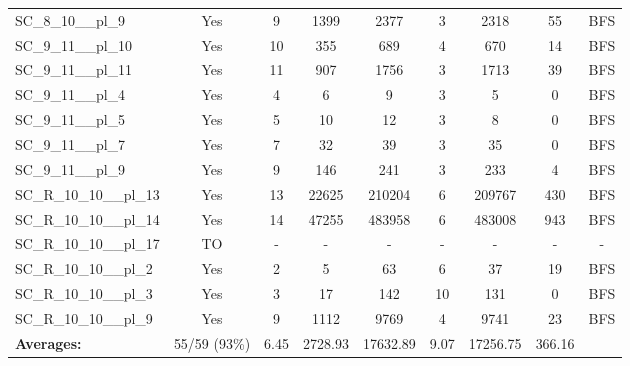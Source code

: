 \documentclass{article}
\begin{document}
\begin{tabular}{lcccccccc}
SC\_8\_10\_\_pl\_9 & Yes & 9 & 1399 & 2377 & 3 & 2318 & 55 & BFS \\
SC\_9\_11\_\_pl\_10 & Yes & 10 & 355 & 689 & 4 & 670 & 14 & BFS \\
SC\_9\_11\_\_pl\_11 & Yes & 11 & 907 & 1756 & 3 & 1713 & 39 & BFS \\
SC\_9\_11\_\_pl\_4 & Yes & 4 & 6 & 9 & 3 & 5 & 0 & BFS \\
SC\_9\_11\_\_pl\_5 & Yes & 5 & 10 & 12 & 3 & 8 & 0 & BFS \\
SC\_9\_11\_\_pl\_7 & Yes & 7 & 32 & 39 & 3 & 35 & 0 & BFS \\
SC\_9\_11\_\_pl\_9 & Yes & 9 & 146 & 241 & 3 & 233 & 4 & BFS \\
SC\_R\_10\_10\_\_pl\_13 & Yes & 13 & 22625 & 210204 & 6 & 209767 & 430 & BFS \\
SC\_R\_10\_10\_\_pl\_14 & Yes & 14 & 47255 & 483958 & 6 & 483008 & 943 & BFS \\
SC\_R\_10\_10\_\_pl\_17 & TO & - & - & - & - & - & - & - \\
SC\_R\_10\_10\_\_pl\_2 & Yes & 2 & 5 & 63 & 6 & 37 & 19 & BFS \\
SC\_R\_10\_10\_\_pl\_3 & Yes & 3 & 17 & 142 & 10 & 131 & 0 & BFS \\
SC\_R\_10\_10\_\_pl\_9 & Yes & 9 & 1112 & 9769 & 4 & 9741 & 23 & BFS \\
\textbf{Averages:} & 55/59 (93\%) & 6.45 & 2728.93 & 17632.89 & 9.07 & 17256.75 & 366.16 & \\
\bottomrule
\end{tabular}
\\[0.7cm]
\end{document}
